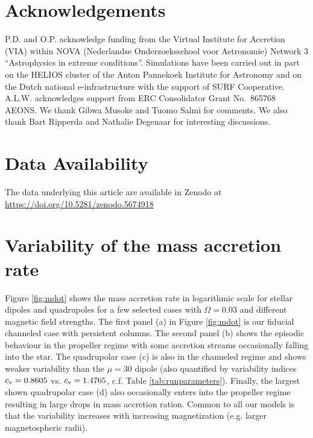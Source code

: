 \documentclass[fleqn,usenatbib]{mnras}
\begin{document}
\section*{Acknowledgements}

P.D. and O.P. acknowledge funding from  the Virtual Institute for Accretion (VIA) within NOVA (Nederlandse Onderzoeksschool voor Astronomie) Network 3 ``Astrophysics in extreme conditions''. Simulations have been carried out in part on the HELIOS cluster of the Anton Pannekoek Institute for Astronomy and on the Dutch national e-infrastructure with the support of SURF Cooperative.  A.L.W. acknowledges support from ERC Consolidator Grant No.~865768 AEONS.  We thank Gibwa Musoke and Tuomo Salmi for comments. We also thank Bart Ripperda and Nathalie Degenaar for interesting discussions. 

\section*{Data Availability}

The data underlying this article are available in Zenodo at \url{https://doi.org/10.5281/zenodo.5674918}


\typeout{}

 



\appendix

\section{Variability of the mass accretion rate}\label{sec:mdot}

Figure \ref{fig:mdot} shows the mass accretion rate in logarithmic scale for stellar dipoles and quadrupoles for a few selected cases with $\Omega = 0.03$ and different magnetic field strengths. The first panel (a) in Figure \ref{fig:mdot} is our fiducial channeled case with persistent columns. The second panel (b) shows the episodic behaviour in the propeller regime with some accretion streams occasionally falling into the star. 
The quadrupolar case (c) is also in the channeled regime and shows weaker variability than the $\mu=30$ dipole (also quantified by variability indices $c_{\rm v}=0.8605$ vs. $c_{\rm v}=1.4765$, c.f. Table \ref{tab:runparameters}).  Finally, the largest shown quadrupolar case (d) also occasionally enters into the propeller regime resulting in large drops in mass accretion ration.  
Common to all our models is that the variability increases with increasing magnetization (e.g. larger magnetospheric radii).  
\end{document}
